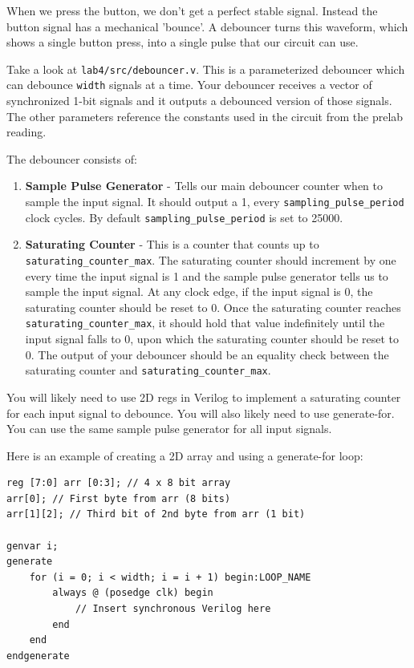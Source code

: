 \documentclass[11pt]{article}
\begin{document}
When we press the button, we don't get a perfect stable signal. Instead the button signal has a mechanical 'bounce'. A debouncer turns this waveform, which shows a single button press, into a single pulse that our circuit can use.

Take a look at \verb|lab4/src/debouncer.v|. This is a parameterized debouncer which can debounce \verb|width| signals at a time. Your debouncer receives a vector of synchronized 1-bit signals and it outputs a debounced version of those signals. The other parameters reference the constants used in the circuit from the prelab reading.

The debouncer consists of:

\begin{enumerate}
	\item \textbf{Sample Pulse Generator} - Tells our main debouncer counter when to sample the input signal. It should output a 1, every \verb|sampling_pulse_period| clock cycles. By default \verb|sampling_pulse_period| is set to 25000.
	
	\item \textbf{Saturating Counter} - This is a counter that counts up to \verb|saturating_counter_max|. The saturating counter should increment by one every time the input signal is 1 and the sample pulse generator tells us to sample the input signal. At any clock edge, if the input signal is 0, the saturating counter should be reset to 0. Once the saturating counter reaches \verb|saturating_counter_max|, it should hold that value indefinitely until the input signal falls to 0, upon which the saturating counter should be reset to 0. The output of your debouncer should be an equality check between the saturating counter and \verb|saturating_counter_max|.
\end{enumerate}

You will likely need to use 2D regs in Verilog to implement a saturating counter for each input signal to debounce. You will also likely need to use generate-for. You can use the same sample pulse generator for all input signals.

Here is an example of creating a 2D array and using a generate-for loop:

\begin{verbatim}
reg [7:0] arr [0:3]; // 4 x 8 bit array
arr[0]; // First byte from arr (8 bits)
arr[1][2]; // Third bit of 2nd byte from arr (1 bit)

genvar i;
generate
	for (i = 0; i < width; i = i + 1) begin:LOOP_NAME
		always @ (posedge clk) begin
			// Insert synchronous Verilog here
		end
	end
endgenerate
\end{verbatim}
\end{document}
